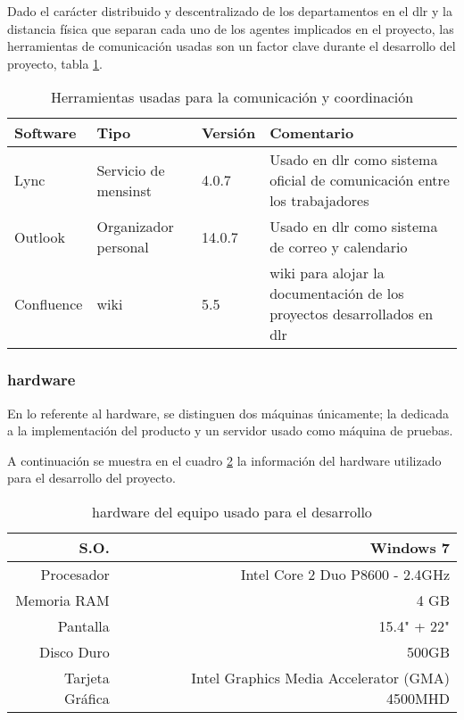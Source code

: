 Dado el carácter distribuido y descentralizado de los departamentos en el \gls{dlr} y la distancia física que separan cada uno de los agentes implicados en el proyecto, las herramientas de comunicación usadas son un factor clave durante el desarrollo del proyecto, tabla \ref{table:softcomu}.

\begin{center}
\begin {table}[H]
\centering
    \begin{tabular}{ | p{3cm}  p{4cm}   p{3cm}   p{5cm} |}
    \hline
    \textbf{Software} & \textbf{Tipo} & \textbf{Versión} & \textbf{Comentario} \\ \hline
    Lync & Servicio de \gls{mensinst} & 4.0.7 & Usado en \gls{dlr} como sistema oficial de comunicación entre los trabajadores \\ \hline
    Outlook & Organizador personal & 14.0.7& Usado en \gls{dlr} como sistema de correo y calendario\\ \hline
    Confluence & \Gls{wiki} & 5.5& \Gls{wiki} para alojar la documentación de los proyectos desarrollados en \gls{dlr} \\ \hline
    \end{tabular}
    \caption{Herramientas usadas para la comunicación y coordinación}
    \label{table:softcomu}
  \end{table}
\end{center}

\subsubsection{\Gls{hardware}}
En lo referente al \gls{hardware}, se distinguen dos máquinas únicamente; la dedicada a la implementación del producto y un servidor usado como máquina de pruebas.

A continuación se muestra en el cuadro \ref{table:harddev} la información del \gls{hardware} utilizado para el desarrollo del proyecto.


\begin{center}
\begin {table}[H]
\centering
    \begin{tabular}{ | r | r |}
    \hline
    S.O.& Windows 7 \\ \hline
    Procesador & Intel Core 2 Duo P8600 - 2.4GHz \\ \hline
    Memoria RAM & 4 GB \\ \hline
    Pantalla & 15.4" + 22" \\ \hline
    Disco Duro & 500GB \\ \hline
    Tarjeta Gráfica & Intel Graphics Media Accelerator (GMA) 4500MHD \\ \hline
    \end{tabular}
    \caption{\Gls{hardware} del equipo usado para el desarrollo}
    \label{table:harddev}
  \end{table}
\end{center}


